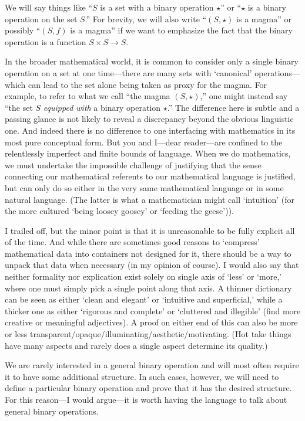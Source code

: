 \documentclass[12pt]{article}
\theoremstyle{definition}
\newcommand{\<}{\left\langle}
\renewcommand{\>}{\right\rangle}
\begin{document}
We will say things like ``$S$ is a set with a binary operation $\star$'' or ``$\star$ is a binary operation on the set $S$.''
For brevity, we will also write ``$(S, \star)$ is a magma'' or possibly ``$(S, f)$ is a magma'' if we want to emphasize the fact that the binary operation is a function $S \times S \to S$.

In the broader mathematical world, it is common to consider only a single binary operation on a set at one time---there are many sets with `canonical' operations---which can lead to the set alone being taken as proxy for the magma.
For example, to refer to what we call ``the magma $(S, \star)$,'' one might instead say ``the set $S$ \textit{equipped with} a binary operation $\star$.''
The difference here is subtle and a passing glance is not likely to reveal a discrepancy beyond the obvious linguistic one.
And indeed there is no difference to one interfacing with mathematics in its most pure conceptual form.
But you and I---dear reader---are confined to the relentlessly imperfect and finite bounds of language.
When we do mathematics, we must undertake the impossible challenge of justifying that the sense connecting our mathematical referents to our mathematical language is justified, but can only do so either in the very same mathematical language or in some natural language.
(The latter is what a mathematician might call `intuition' (for the more cultured `being loosey goosey' or `feeding the geese')).

I trailed off, but the minor point is that it is unreasonable to be fully explicit all of the time.
And while there are sometimes good reasons to `compress' mathematical data into containers not designed for it, there should be a way to unpack that data when necessary (in my opinion of course).
I would also say that neither formality nor explication exist solely on single axis of `less' or `more,' where one must simply pick a single point along that axis.
A thinner dictionary can be seen as either `clean and elegant' or `intuitive and superficial,' while a thicker one as either `rigorous and complete' or `cluttered and illegible' (find more creative or meaningful adjectives).
A proof on either end of this can also be more or less transparent/opaque/illuminating/aesthetic/motivating.
(Hot take things have many aspects and rarely does a single aspect determine its quality.)

We are rarely interested in a general binary operation and will most often require it to have some additional structure.
In such cases, however, we will need to define a particular binary operation and prove that it has the desired structure.
For this reason---I would argue---it is worth having the language to talk about general binary operations.
\end{document}
